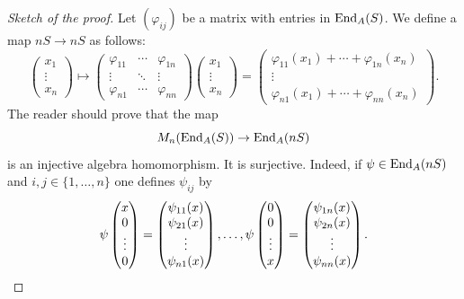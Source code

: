\begin{proof}[Sketch of the proof]
	Let $(\varphi_{ij})$ be a matrix with entries in $\operatorname{End}_A(S)$. We define a map
	$nS\to nS$ as follows:
	\[
	\begin{pmatrix}
	x_1\\
	\vdots\\
	x_n	
	\end{pmatrix}
	\mapsto 
		\begin{pmatrix}
			\varphi_{11} & \cdots & \varphi_{1n}\\
			\vdots & \ddots & \vdots\\
			\varphi_{n1} & \cdots & \varphi_{nn}
		\end{pmatrix}
		\begin{pmatrix}
		x_1\\
		\vdots\\
		x_n	
		\end{pmatrix}
		=\begin{pmatrix}
			\varphi_{11}(x_1)+\cdots+\varphi_{1n}(x_n)\\
			\vdots\\
			\varphi_{n1}(x_1)+\cdots+\varphi_{nn}(x_n)
		\end{pmatrix}.
	\]
	The reader should prove that the map  
	\[
		M_n(\operatorname{End}_A(S))\to\operatorname{End}_A(nS)
	\]
	is an injective algebra homomorphism. 
	It is surjective. Indeed, if $\psi\in\operatorname{End}_A(nS)$ and 
	$i,j\in\{1,\dots,n\}$ one defines $\psi_{ij}$ by 
	\[
		\psi\begin{pmatrix}
		x\\
		0\\
		\vdots\\
		0	
		\end{pmatrix}
		=\begin{pmatrix}
		\psi_{11}(x)\\
		\psi_{21}(x)\\
		\vdots\\
		\psi_{n1}(x)
		\end{pmatrix},\dots,
		\psi\begin{pmatrix}
		0\\
		0\\
		\vdots\\
		x	
		\end{pmatrix}
		=\begin{pmatrix}
		\psi_{1n}(x)\\
		\psi_{2n}(x)\\
		\vdots\\
		\psi_{nn}(x)
		\end{pmatrix}.\qedhere
	\]
\end{proof}

